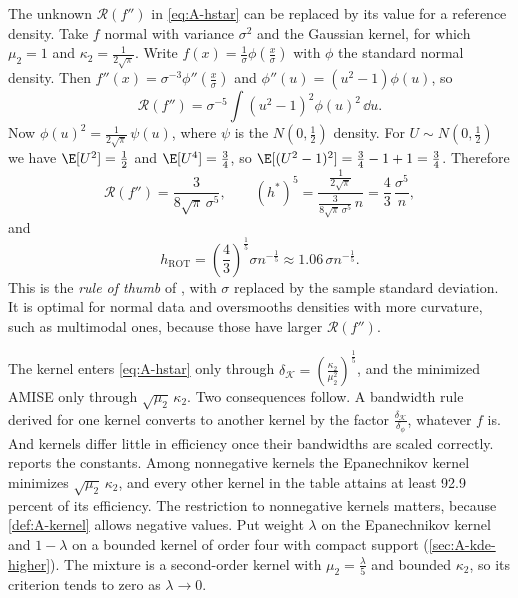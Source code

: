 The unknown $\mathcal{R}(f'')$ in \eqref{eq:A-hstar} can be replaced by its value for a reference
density. Take $f$ normal with variance $\sigma^2$ and the Gaussian kernel, for which $\mu_2=1$ and
$\kappa_2=\frac{1}{2\sqrt\pi}$. Write $f(x)=\frac{1}{\sigma}\phi(\frac{x}{\sigma})$ with $\phi$ the
standard normal density. Then $f''(x)=\sigma^{-3}\phi''(\frac{x}{\sigma})$ and
$\phi''(u)=(u^2-1)\phi(u)$, so
\begin{equation*}
\mathcal{R}(f'')=\sigma^{-5}\int(u^2-1)^2\phi(u)^2\,\dd u .
\end{equation*}
Now $\phi(u)^2=\frac{1}{2\sqrt\pi}\,\psi(u)$, where $\psi$ is the $N(0,\frac{1}{2})$ density. For
$U\sim N(0,\frac{1}{2})$ we have $\E[U^2]=\frac{1}{2}$ and $\E[U^4]=\frac{3}{4}$, so
$\E[(U^2-1)^2]=\frac{3}{4}-1+1=\frac{3}{4}$. Therefore
\begin{equation*}
\mathcal{R}(f'')=\frac{3}{8\sqrt\pi\,\sigma^5},\qquad
(h^*)^5=\frac{\frac{1}{2\sqrt\pi}}{\frac{3}{8\sqrt\pi\,\sigma^5}\,n}=\frac{4}{3}\,\frac{\sigma^5}{n},
\end{equation*}
and
\begin{equation}\label{eq:A-silverman}
h_{\mathrm{ROT}}=\left(\frac{4}{3}\right)^{\frac{1}{5}}\sigma n^{-\frac{1}{5}}\approx1.06\,\sigma n^{-\frac{1}{5}} .
\end{equation}
This is the \emph{rule of thumb} of \citet{Silverman1986}, with $\sigma$ replaced by the sample standard
deviation. It is optimal for normal data and oversmooths densities with more curvature, such as
multimodal ones, because those have larger $\mathcal{R}(f'')$.

The kernel enters \eqref{eq:A-hstar} only through $\delta_{\mathcal{K}}=(\frac{\kappa_2}{\mu_2^2})^{\frac{1}{5}}$,
and the minimized AMISE only through $\sqrt{\mu_2}\,\kappa_2$. Two consequences follow. A bandwidth
rule derived for one kernel converts to another kernel by the factor
$\frac{\delta_{\mathcal{K}}}{\delta_{\phi}}$, whatever $f$ is. And kernels differ little in efficiency
once their bandwidths are scaled correctly.  reports the constants. Among nonnegative
kernels the Epanechnikov kernel minimizes $\sqrt{\mu_2}\,\kappa_2$, and every other kernel in the table
attains at least 92.9 percent of its efficiency. The restriction to nonnegative kernels matters, because
\cref{def:A-kernel} allows negative values. Put weight $\lambda$ on the Epanechnikov kernel and $1 - \lambda$
on a bounded kernel of order four with compact support (\cref{sec:A-kde-higher}). The mixture is a second-order
kernel with $\mu_2 = \frac{\lambda}{5}$ and bounded $\kappa_2$, so its criterion tends to zero as $\lambda \to 0$.

